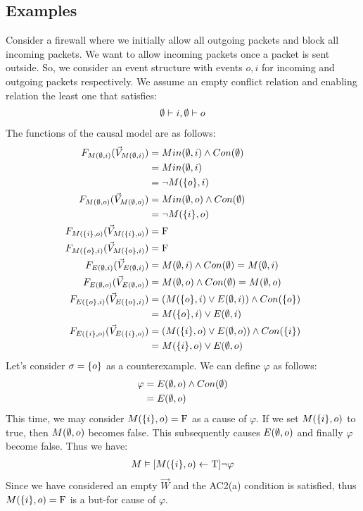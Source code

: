 \subsection{Examples}
\begin{example}
    Consider a firewall where we initially allow all outgoing packets and block all incoming packets.
    We want to allow incoming packets once a packet is sent outside.
    So, we consider an event structure with events $o,i$ for incoming and
    outgoing packets respectively.
    We assume an empty conflict relation and enabling relation
    the least one that satisfies:
    \begin{align*}
        \emptyset \vdash i, \emptyset \vdash o
    \end{align*}
    The functions of the causal model are as follows:
    \begin{align*}
        F_{M(\emptyset,i)}(\vec V_{M(\emptyset,i)})    & = Min(\emptyset,i) \wedge Con(\emptyset)               \\
                       & = Min(\emptyset,i)                              \\
                       & = \neg M(\{o\},i)                        \\
        F_{M(\emptyset,o)}(\vec V_{M(\emptyset,o)})    & = Min(\emptyset,o) \wedge Con(\emptyset)               \\
                       & = \neg M(\{i\},o)                        \\
        F_{M(\{i\},o)}(\vec V_{M(\{i\},o)}) & = \mathrm{F}                                     \\
        F_{M(\{o\},i)}(\vec V_{M(\{o\},i)}) & = \mathrm{F}                                     \\
        F_{E(\emptyset,i)}(\vec V_{E(\emptyset,i)})    & = M(\emptyset,i) \wedge Con(\emptyset) = M(\emptyset,i)       \\
        F_{E(\emptyset,o)}(\vec V_{E(\emptyset,o)})    & = M(\emptyset,o) \wedge Con(\emptyset) = M(\emptyset,o)       \\
        F_{E(\{o\},i)}(\vec V_{E(\{o\},i)}) & =
        \left( M(\{o\},i) \vee E(\emptyset,i)  \right) \wedge Con(\{o\}) \\
                       & = M(\{o\},i) \vee E(\emptyset,i)                \\
        F_{E(\{i\},o)}(\vec V_{E(\{i\},o)}) & =
        \left( M(\{i\},o) \vee E(\emptyset,o) \right)
        \wedge Con(\{i\})                                         \\
                       & = M(\{i\},o) \vee E(\emptyset,o)                \\
    \end{align*}
    Let's consider $\sigma = \{o\}$ as a counterexample.
    We can define $\varphi$ as follows:
    \begin{align*}
        \varphi & = E(\emptyset,o) \wedge Con(\emptyset) \\
                & = E(\emptyset,o)
    \end{align*}
    This time, we may consider $M(\{i\},o) = \mathrm{F}$ as a cause of $\varphi$.
    If we set $M(\{i\},o)$ to true, then $M(\emptyset,o)$ becomes false.
    This subsequently causes $E(\emptyset,o)$ and finally $\varphi$ become false.
    Thus we have:
    \begin{align*}
        M \vDash [M(\{i\},o) \leftarrow \mathrm{T}] \neg \varphi
    \end{align*}
    Since we have considered an empty $\vec W$ and the AC2(a) condition
    is satisfied, thus $M(\{i\},o) = \mathrm{F}$ is a but-for cause of $\varphi$.


\end{example}
